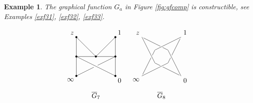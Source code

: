 \documentclass[oneside]{amsart}
\newcommand{\Gg}{{\overline{G}}}
\theoremstyle{plain}
\newtheorem{ex}[thm]{Example}
\begin{document}
\begin{ex}
The graphical function $G_a$ in Figure \ref{fig:gfcomp} is constructible, see Examples \ref{exf31}, \ref{exf32}, \ref{exf33}.
\end{ex}

\begin{figure}
    \def\scale{1}
\begin{align*}
\begin{tikzpicture}[baseline={([yshift=-.7ex]0,0)}]
    \coordinate (vm) at  (0,0);
    \coordinate[label=above left:$z$] (vz) at  (-\scale, \scale);
    \coordinate[label=above right:$1$] (v1) at  ( \scale, \scale);
    \coordinate[label=below left:$\infty$] (voo) at (-\scale,-\scale);
    \coordinate[label=below right:$0$] (v0)  at (\scale, -\scale);
    \coordinate (v2)  at (-\scale, 0);
    \coordinate (v3)  at (\scale, 0);
    \coordinate (vm)  at (0, 0);
    \node (G) at (0,{-2*\scale}) {$\Gg_7$};
%
    \draw[preaction={draw, white, line width=5pt, -}] (voo) -- (v3);
    \draw[preaction={draw, white, line width=5pt, -}] (v0) -- (v2);
    \draw (voo) -- (v2);
    \draw (v0) -- (v3);
    \draw (vm) -- (v2);
    \draw (vm) -- (v3);
    \draw (vm) -- (vz);
    \draw (vm) -- (v1);
    \draw (v2) -- (vz);
    \draw (v3) -- (v1);
%
    \filldraw (v0) circle (1.3pt);
    \filldraw (v1) circle (1.3pt);
    \filldraw (vz) circle (1.3pt);
    \filldraw (voo) circle (1.3pt);
    \filldraw (v2) circle (1.3pt);
    \filldraw (v3) circle (1.3pt);
    \filldraw (vm) circle (1.3pt);
\end{tikzpicture}
&&
\begin{tikzpicture}[baseline={([yshift=-.7ex]0,0)}]
    \coordinate (vm) at  (0,0);
    \coordinate[label=above left:$z$] (vz) at  (-\scale, \scale);
    \coordinate[label=above right:$1$] (v1) at  ( \scale, \scale);
    \coordinate[label=below left:$\infty$] (voo) at (-\scale,-\scale);
    \coordinate[label=below right:$0$] (v0)  at (\scale, -\scale);
    \coordinate (v2)  at ({ \scale/3}, { \scale/3});
    \coordinate (v3)  at ({-\scale/3}, { \scale/3});
    \coordinate (v4)  at ({-\scale/3}, {-\scale/3});
    \coordinate (v5)  at ({ \scale/3}, {-\scale/3});
    \node (G) at (0,{-2*\scale}) {$\Gg_8$};
%
    \draw (vz) -- (v2);
    \draw (voo) -- (v3);
    \draw (v0) -- (v4);
    \draw (v1) -- (v5);
    \draw[preaction={draw, white, line width=3pt, -}] (vz) -- (v4);
    \draw[preaction={draw, white, line width=3pt, -}] (voo) -- (v5);
    \draw[preaction={draw, white, line width=3pt, -}] (v0) -- (v2);
    \draw[preaction={draw, white, line width=3pt, -}] (v1) -- (v3);

\end{tikzpicture}
\end{align*}
\end{figure}
\end{document}
